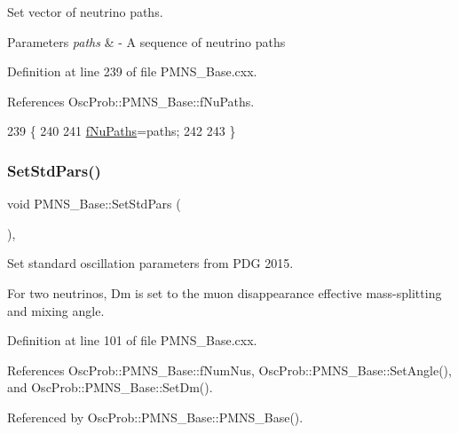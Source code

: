 Set vector of neutrino paths. 
\begin{DoxyParams}{Parameters}
{\em paths} & -\/ A sequence of neutrino paths \\
\hline
\end{DoxyParams}


Definition at line 239 of file P\+M\+N\+S\+\_\+\+Base.\+cxx.



References Osc\+Prob\+::\+P\+M\+N\+S\+\_\+\+Base\+::f\+Nu\+Paths.


\begin{DoxyCode}
239                                               \{
240 
241   \hyperlink{classOscProb_1_1PMNS__Base_a69db9d57e12fc7cbe0431bc6c18fac93}{fNuPaths}=paths;
242 
243 \}
\end{DoxyCode}
\mbox{\label{classOscProb_1_1PMNS__Base_a4de96ac9b6d1e9b029ab877e57d211ad}} 
\subsubsection{\texorpdfstring{Set\+Std\+Pars()}{SetStdPars()}}
{\footnotesize\ttfamily void P\+M\+N\+S\+\_\+\+Base\+::\+Set\+Std\+Pars (\begin{DoxyParamCaption}{ }\end{DoxyParamCaption})\hspace{0.3cm}{\ttfamily [virtual]}, {\ttfamily [inherited]}}

Set standard oscillation parameters from P\+DG 2015.

For two neutrinos, Dm is set to the muon disappearance effective mass-\/splitting and mixing angle. 

Definition at line 101 of file P\+M\+N\+S\+\_\+\+Base.\+cxx.



References Osc\+Prob\+::\+P\+M\+N\+S\+\_\+\+Base\+::f\+Num\+Nus, Osc\+Prob\+::\+P\+M\+N\+S\+\_\+\+Base\+::\+Set\+Angle(), and Osc\+Prob\+::\+P\+M\+N\+S\+\_\+\+Base\+::\+Set\+Dm().



Referenced by Osc\+Prob\+::\+P\+M\+N\+S\+\_\+\+Base\+::\+P\+M\+N\+S\+\_\+\+Base().


